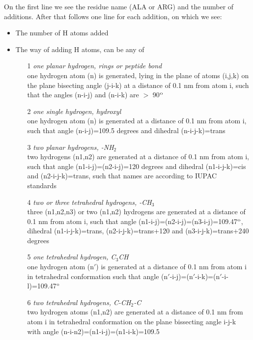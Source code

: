 On the first line we see the residue name (ALA or ARG) and the number
of additions. After that follows one line for each addition, on which
we see:
\begin{itemize}
\item The number of H atoms added
\item The way of adding H atoms, can be any of
\begin{enumerate}
\item[1]{\em one planar hydrogen, {\eg} rings or peptide bond}\\
one hydrogen atom (n) is generated, lying in the plane of atoms
(i,j,k) on the plane bisecting angle (j-i-k) at a distance of 0.1 nm
from atom i, such that the angles (n-i-j) and (n-i-k) are $>$ 90$^{\rm o}$

\item[2]{\em one single hydrogen, {\eg} hydroxyl}\\
one hydrogen atom (n) is generated at a distance of 0.1 nm from atom
i, such that angle (n-i-j)=109.5 degrees and dihedral (n-i-j-k)=trans

\item[3]{\em two planar hydrogens, {\eg} -NH{$_2$}}\\
two hydrogens (n1,n2) are generated at a distance of 0.1 nm from atom
i, such that angle (n1-i-j)=(n2-i-j)=120 degrees and dihedral
(n1-i-j-k)=cis and (n2-i-j-k)=trans, such that names are according to
IUPAC standards~\cite{iupac70}

\item[4]{\em two or three tetrahedral hydrogens, {\eg} -CH{$_3$}}\\
three (n1,n2,n3) or two (n1,n2) hydrogens are generated at a distance
of 0.1 nm from atom i, such that angle
(n1-i-j)=(n2-i-j)=(n3-i-j)=109.47$^{\rm o}$, dihedral (n1-i-j-k)=trans,
(n2-i-j-k)=trans+120 and (n3-i-j-k)=trans+240 degrees

\item[5]{\em one tetrahedral hydrogen, {\eg} C{$_3$}CH}\\
one hydrogen atom (n$\prime$) is generated at a distance of 0.1 nm from atom
i in tetrahedral conformation such that angle
(n$\prime$-i-j)=(n$\prime$-i-k)=(n$\prime$-i-l)=109.47$^{\rm o}$

\item[6]{\em two tetrahedral hydrogens, {\eg} C-CH{$_2$}-C}\\
two hydrogen atoms (n1,n2) are generated at a distance of 0.1 nm from
atom i in tetrahedral conformation on the plane bissecting angle i-j-k
with angle (n-i-n2)=(n1-i-j)=(n1-i-k)=109.5


\end{enumerate}
\end{itemize}
